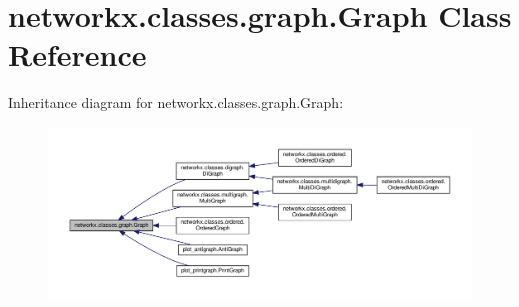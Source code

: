 \hypertarget{classnetworkx_1_1classes_1_1graph_1_1Graph}{}\section{networkx.\+classes.\+graph.\+Graph Class Reference}
\label{classnetworkx_1_1classes_1_1graph_1_1Graph}


Inheritance diagram for networkx.\+classes.\+graph.\+Graph\+:
\nopagebreak
\begin{figure}[H]
\begin{center}
\leavevmode
\includegraphics[width=350pt]{classnetworkx_1_1classes_1_1graph_1_1Graph__inherit__graph}
\end{center}
\end{figure}
